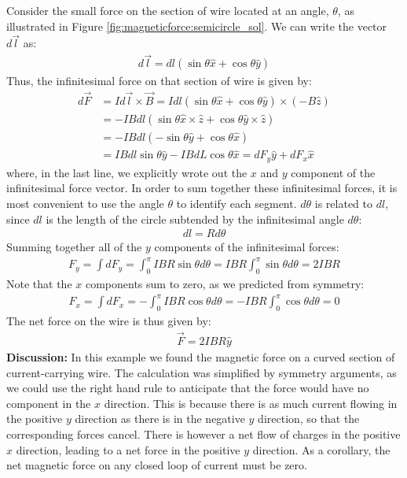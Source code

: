 \begin{example}
Consider the small force on the section of wire located at an angle, $\theta$, as illustrated in Figure \ref{fig:magneticforce:semicircle_sol}. We can write the vector $d\vec l$ as:
\begin{align*}
d\vec l = dl(\sin\theta\hat x + \cos\theta \hat y)
\end{align*}
Thus, the infinitesimal force on that section of wire is given by:
\begin{align*}
d\vec F &= I d\vec l \times \vec B = I dl(\sin\theta\hat x + \cos\theta \hat y)\times (-B\hat z)\\
&=-IBdl (\sin\theta\hat x \times \hat z + \cos\theta \hat y \times \hat z)\\
&=-IBdl (-\sin\theta \hat y + \cos\theta\hat x) \\
&= IBdl\sin\theta \hat y - IBdL\cos\theta \hat x = dF_y\hat y + dF_x \hat x
\end{align*} 
where, in the last line, we explicitly wrote out the $x$ and $y$ component of the infinitesimal force vector. In order to sum together these infinitesimal forces, it is most convenient to use the angle $\theta$ to identify each segment. $d\theta$ is related to $dl$, since $dl$ is the length of the circle subtended by the infinitesimal angle $d\theta$:
\begin{align*}
dl = Rd\theta
\end{align*}
Summing together all of the $y$ components of the infinitesimal forces:
\begin{align*}
F_y = \int dF_y = \int_0^\pi IBR\sin\theta d\theta=IBR \int_0^\pi\sin\theta d\theta=2IBR
\end{align*}
Note that the $x$ components sum to zero, as we predicted from symmetry:
\begin{align*}
F_x = \int dF_x = -\int_0^\pi IBR\cos\theta d\theta=-IBR \int_0^\pi\cos\theta d\theta=0
\end{align*}
The net force on the wire is thus given by:
\begin{align*}
\vec F = 2IBR\hat y
\end{align*}
\textbf{Discussion: }In this example we found the magnetic force on a curved section of current-carrying wire. The calculation was simplified by symmetry arguments, as we could use the right hand rule to anticipate that the force would have no component in the $x$ direction. This is because there is as much current flowing in the positive $y$ direction as there is in the negative $y$ direction, so that the corresponding forces cancel. There is however a net flow of charges in the positive $x$ direction, leading to a net force in the positive $y$ direction. As a corollary, the net magnetic force on any closed loop of current must be zero.
\end{example}

